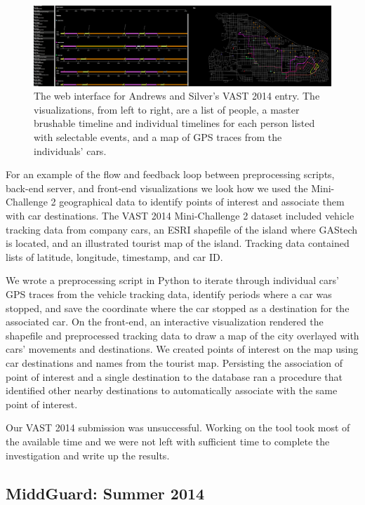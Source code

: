 \documentclass[midd]{thesis}
\begin{document}
\begin{figure}[!ht]
  \centering
  \includegraphics[width=1\textwidth]{vast-mc2-2014-cropped-scaled}
  \caption{The web interface for Andrews and Silver's VAST 2014 entry. The
  visualizations, from left to right, are a list of people, a master brushable
  timeline and individual timelines for each person listed with selectable
  events, and a map of GPS traces from the individuals' cars.}
  \label{fig:vast2014}
\end{figure}

For an example of the flow and feedback loop between preprocessing scripts,
back-end server, and front-end visualizations we look how we used the
Mini-Challenge 2 geographical data to identify points of interest and associate
them with car destinations. The VAST 2014 Mini-Challenge 2 dataset included
vehicle tracking data from company cars, an ESRI shapefile of the island where
GAStech is located, and an illustrated tourist map of the island. Tracking data
contained lists of latitude, longitude, timestamp, and car ID.

We wrote a preprocessing script in Python to iterate through individual
cars' GPS traces from the vehicle tracking data, identify periods where a car
was stopped, and save the coordinate where the car stopped as a destination for
the associated car. On the front-end, an interactive visualization rendered the
shapefile and preprocessed tracking data to draw a map of the city overlayed
with cars' movements and destinations. We created points of interest on the map
using car destinations and names from the tourist map. Persisting the
association of point of interest and a single destination to the database ran a
procedure that identified other nearby destinations to automatically associate
with the same point of interest.

Our VAST 2014 submission was unsuccessful. Working on the tool took most of the
available time and we were not left with sufficient time to complete the
investigation and write up the results.

\subsection{MiddGuard: Summer 2014}
\end{document}
